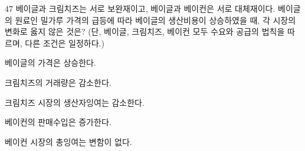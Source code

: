 \begin{question}{47}
베이글과 크림치즈는 서로 보완재이고, 베이글과 베이컨은 서로 대체재이다. 베이글의 원료인 밀가루 가격의 급등에 따라 베이글의 생산비용이 상승하였을 때, 각 시장의 변화로 옳지 않은 것은? (단, 베이글, 크림치즈, 베이컨 모두 수요와 공급의 법칙을 따르며, 다른 조건은 일정하다.)
\begin{choices}
  \item 베이글의 가격은 상승한다.
  \item 크림치즈의 거래량은 감소한다.
  \item 크림치즈 시장의 생산자잉여는 감소한다.
  \item 베이컨의 판매수입은 증가한다.
  \item 베이컨 시장의 총잉여는 변함이 없다.
\end{choices}
\end{question}
